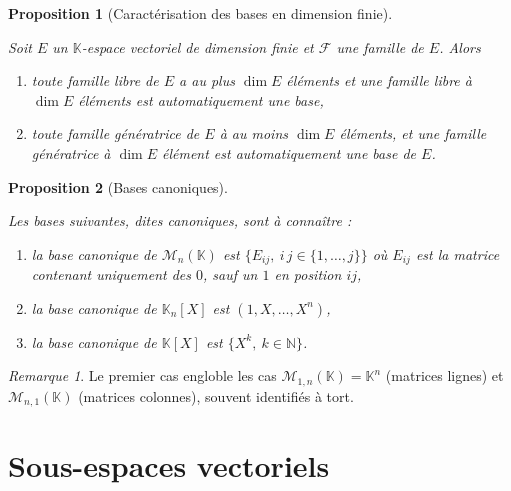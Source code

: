 \documentclass[
  french,
  letterpaper,
  DIV=11,
  numbers=noendperiod]{scrreprt}
\theoremstyle{plain}
\theoremstyle{definition}
\theoremstyle{plain}
\newtheorem{proposition}{Proposition}[chapter]
\theoremstyle{plain}
\theoremstyle{definition}
\theoremstyle{definition}
\theoremstyle{plain}
\theoremstyle{remark}
\newtheorem{refremark}{Remarque}[chapter]
\begin{document}
\begin{proposition}[Caractérisation des bases en dimension
finie]\protect\hypertarget{prp-caractérisation-base}{}\label{prp-caractérisation-base}

Soit \(E\) un \(\mathbb{K}\)-espace vectoriel de dimension finie et
\(\mathcal{F}\) une famille de \(E\). Alors

\begin{enumerate}
\def\labelenumi{\arabic{enumi}.}
\item
  toute famille libre de \(E\) a au plus \(\dim E\) éléments et une
  famille libre à \(\dim E\) éléments est automatiquement une base,
\item
  toute famille génératrice de \(E\) à au moins \(\dim E\) éléments, et
  une famille génératrice à \(\dim E\) élément est automatiquement une
  base de \(E\).
\end{enumerate}

\end{proposition}

\begin{proposition}[Bases
canoniques]\protect\hypertarget{prp-base-canonique}{}\label{prp-base-canonique}

Les bases suivantes, dites \emph{canoniques}, sont à connaître :

\begin{enumerate}
\def\labelenumi{\arabic{enumi}.}
\item
  la base canonique de \(\mathcal{M}_n(\mathbb{K})\) est \(\{E_{ij},\
  i\,j\in\{1,\dots,j\}\}\) où \(E_{ij}\) est la matrice contenant
  uniquement des \(0\), sauf un \(1\) en position \(ij\),
\item
  la base canonique de \(\mathbb{K}_n[X]\) est \((1,X,\dots,X^n)\),
\item
  la base canonique de \(\mathbb{K}[X]\) est
  \(\{X^k,\ k\in\mathbb{N}\}\).
\end{enumerate}

\end{proposition}

\begin{refremark}
Le premier cas engloble les cas
\(\mathcal{M}_{1,n}(\mathbb{K})=\mathbb{K}^{n}\) (matrices lignes) et
\(\mathcal{M}_{n,1}(\mathbb{K})\) (matrices colonnes), souvent
identifiés à tort.

\label{rem-cas-particulier}

\end{refremark}

\section{Sous-espaces vectoriels}\label{sec-03-sous-espaces-vectoriels}
\end{document}
